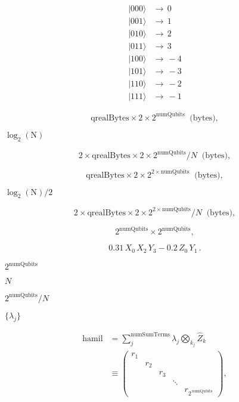 \documentclass{article}
\begin{document}
\[ 
\begin{aligned}
    |000\rangle & \rightarrow \, 0 \\
    |001\rangle & \rightarrow \, 1 \\
    |010\rangle & \rightarrow \, 2 \\
    |011\rangle & \rightarrow \, 3 \\
    |100\rangle & \rightarrow \,-4 \\
    |101\rangle & \rightarrow \,-3 \\
    |110\rangle & \rightarrow \,-2 \\
    |111\rangle & \rightarrow \,-1
\end{aligned}
\]
\pagebreak

\[ 
     \text{qrealBytes} \times 2 \times 2^\text{numQubits}\;\;\text{(bytes)},
\]
\pagebreak

$\log_2(\text{N})$
\pagebreak

\[ 
     2 \times \text{qrealBytes} \times 2 \times 2^\text{numQubits}/N  \;\;\text{(bytes)},
\]
\pagebreak

\[ 
     \text{qrealBytes} \times 2 \times 2^{2 \times\text{numQubits}}\;\;\text{(bytes)},
\]
\pagebreak

$\log_2(\text{N})/2$
\pagebreak

\[ 
     2 \times \text{qrealBytes} \times 2 \times 2^{2\times\text{numQubits}}/N  \;\;\text{(bytes)},
\]
\pagebreak

\[
     2^{\text{numQubits}} \times 2^{\text{numQubits}},
\]
\pagebreak

\[ 
     0.31 \, X_0 \, X_2 \, Y_3 -0.2 \, Z_0 \, Y_1 \,.
\]
\pagebreak

$2^{\text{numQubits}}$
\pagebreak

$N$
\pagebreak

$2^{\text{numQubits}}/N$
\pagebreak

$\{\lambda_j\}$
\pagebreak

\[
     \begin{aligned}
     \text{hamil} &= \sum\limits_j^{\text{numSumTerms}} \lambda_j
                     \bigotimes\limits_{k_j} \hat{Z}_k \\
     &\equiv \begin{pmatrix}
             r_1 \\ & r_2 \\ & & r_3 \\ & & & \ddots \\ & & & & r_{2^{\,\text{numQubits}}}
         \end{pmatrix},
     \end{aligned}
\]
\pagebreak
\end{document}
